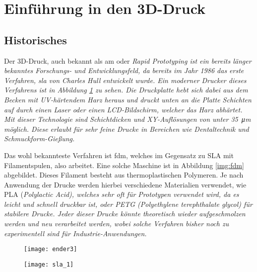 \documentclass[../main.tex]{subfiles}
\begin{document}
\section{Einführung in den 3D-Druck}
\subsection{Historisches}
Der 3D-Druck, auch bekannt als \acrfull{am} oder \it{Rapid Prototyping} ist ein bereits länger bekanntes Forschungs- und Entwicklungsfeld, da bereits im Jahr 1986 das erste Verfahren, \acrfull{sla} von Charles Hull entwickelt wurde.
Ein moderner Drucker dieses Verfahrens ist in Abbildung \ref{img:sla} zu sehen. 
Die Druckplatte hebt sich dabei aus dem Becken mit UV-härtendem Harz heraus und druckt unten an die Platte Schichten auf durch einen Laser oder einen LCD-Bildschirm, welcher das Harz abhärtet. 
Mit dieser Technologie sind Schichtdicken und XY-Auflösungen von unter \qty{35}{\micro\meter} möglich. Diese erlaubt für sehr feine Drucke in Bereichen wie Dentaltechnik und Schmuckform-Gießung. \parencite{FORMLABS_1}

Das wohl bekannteste Verfahren ist \acrfull{fdm}, welches im Gegensatz zu SLA mit Filamentspulen, also  arbeitet. Eine solche Maschine ist in  Abbildung \ref{img:fdm} abgebildet.
Dieses Filament besteht aus thermoplastischen Polymeren. Je nach Anwendung der Drucke werden hierbei verschiedene Materialien verwendet, wie PLA (\it{Polylactic Acid}), welches sehr oft für Prototypen verwendet wird, da es leicht und schnell druckbar ist, oder PETG (\it{Polyethylene terephthalate glycol}) für stabilere Drucke. 
Jeder dieser Drucke könnte theoretisch wieder aufgeschmolzen werden und neu verarbeitet werden, wobei solche Verfahren bisher noch zu experimentell sind für Industrie-Anwendungen. \parencite{OLADAPO2023165046}  

\begin{figure}[H]
\centering
\begin{minipage}{.5\textwidth}
  \centering
  \texttt{[image: ender3]}
  \label{img:fdm}
\end{minipage}%
\begin{minipage}{.5\textwidth}
  \centering
  \texttt{[image: sla\_1]}
  \label{img:sla}
\end{minipage}
\end{figure}
\end{document}
